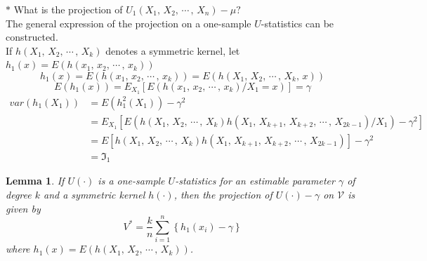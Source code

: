 \documentclass[12pt,a4paper]{report}
\theoremstyle{definition}
\theoremstyle{plain}
\newtheorem{lem}[thm]{Lemma}
\begin{document}
$*$ What is the projection of $U_1(X_1, \, X_2, \, \cdots\, , \, X_n) - \mu?$\\

The general expression of the projection on a one-sample $U$-statistics can be constructed.\\

If $h(X_1, \, X_2, \, \cdots\, , \, X_k)$ denotes a symmetric kernel, let $h_1(x) = E\left(h(x_1, \, x_2, \, \cdots\, , \, x_k)\right)$
$$h_1(x) = E\left(h(x_1, \, x_2, \, \cdots\, , \, x_k)\right) = E\left(h(X_1, \, X_2, \, \cdots\, , \, X_k, \, x)\right)$$
$$E\left(h_1(x)\right) = E_{X_1}\left[E\left(h(x_1, \, x_2, \, \cdots\, , \, x_k)/X_1 = x\right)\right] = \gamma$$
\begin{align*}
var\left(h_1(X_1)\right) & = E\left(h^2_1(X_1)\right) - \gamma^2\\
& = E_{X_1}\left[E\left(h(X_1, \, X_2, \, \cdots\, , \, X_k)h(X_1, \, X_{k +1}, \, X_{k + 2}, \, \cdots\, , \, X_{2k - 1})/X_1\right) - \gamma^2\right]\\
& = E\left[h(X_1, \, X_2, \, \cdots\, , \, X_k)h(X_1, \, X_{k + 1}, \, X_{k + 2}, \, \cdots\, , \, X_{2k - 1})\right] - \gamma^2\\
& = \Im_1
\end{align*}


\begin{lem}
If $U(\cdot)$ is a one-sample $U$-statistics for an estimable parameter $\gamma$ of degree $k$ and a symmetric kernel $h(\cdot)$, then the projection of $U(\cdot)-\gamma$ on $\mathcal{V}$ is given by $$V^* = \frac{k}{n}\sum^n_{i = 1} \left\{h_1(x_i) - \gamma\right\}$$
where $h_1(x) = E\left(h(X_1, \, X_2, \, \cdots\, , \, X_k)\right)$.
\end{lem}
\end{document}
